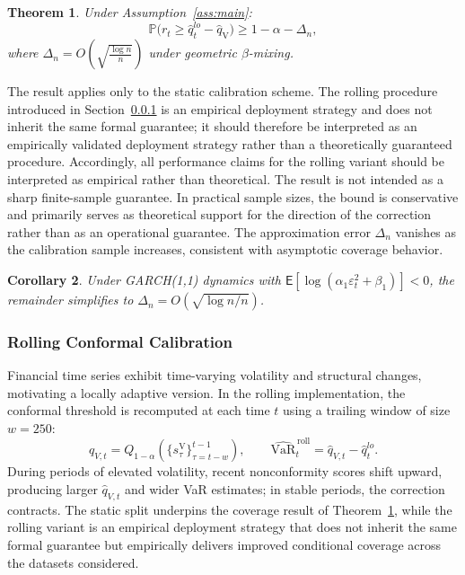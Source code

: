 \documentclass[preprint,11pt,authoryear]{elsarticle}
\newtheorem{theorem}{Theorem}[section]
\newtheorem{corollary}[theorem]{Corollary}
\newcommand{\VaR}{\mathrm{VaR}}
\newcommand{\E}{\mathsf{E}}
\newcommand{\1}{\boldsymbol{1}}
\newcommand{\qV}{\hat{q}_{\scriptscriptstyle\mathrm{V}}}
\begin{document}
	\begin{theorem}
		\label{thm:dependent_conformal_var}
		Under Assumption~\ref{ass:main}:
		\[
		\mathbb{P}\big(r_{t} \geq \hat{q}_t^{lo} - \qV\big)
		\ge 1 - \alpha - \Delta_n,
		\]
		where $\Delta_n = O\!\left(\sqrt{\frac{\log n}{n}}\right)$
		under geometric $\beta$-mixing.
	\end{theorem}
	
	The result applies only to the static calibration scheme. The rolling procedure introduced in Section~\ref{sec:rolling_method} is an empirical deployment strategy and does not inherit the same formal guarantee; it should therefore be interpreted as an empirically validated deployment strategy rather than a theoretically guaranteed procedure. Accordingly, all performance claims for the rolling variant should be interpreted as empirical rather than theoretical.
	The result is not intended as a sharp finite-sample guarantee. In practical sample sizes, the bound is conservative and primarily serves as theoretical support for the direction of the correction rather than as an operational guarantee.
	The approximation error $\Delta_n$ vanishes as the
	calibration sample increases, consistent with asymptotic coverage behavior.
	
	\begin{corollary}
		\label{cor:garch_conformal_var}
		Under GARCH(1,1) dynamics with
		$\E[\log(\alpha_1\varepsilon_t^2 + \beta_1)] < 0$, the
		remainder simplifies to
		$\Delta_n = O(\sqrt{\log n / n})$.
	\end{corollary}
	
	\subsubsection{Rolling Conformal Calibration}
	\label{sec:rolling_method}
	
	Financial time series exhibit time-varying volatility and
	structural changes, motivating a locally adaptive version. In
	the rolling implementation, the conformal threshold is
	recomputed at each time $t$ using a trailing window of size
	$w = 250$:
	\begin{equation}
		\hat{q}_{V,t} = Q_{1-\alpha}\!\left(
		\{s_\tau^{\mathrm{V}}\}_{\tau=t-w}^{t-1}\right),
		\qquad
		\widehat{\VaR}_t^{\,\mathrm{roll}}
		= \hat{q}_{V,t} - \hat{q}_t^{lo}.
		\label{eq:rolling_qv}
	\end{equation}
	During periods of elevated volatility, recent nonconformity
	scores shift upward, producing larger $\hat{q}_{V,t}$ and
	wider VaR estimates; in stable periods, the correction
	contracts. The static split underpins the coverage result of
	Theorem~\ref{thm:dependent_conformal_var}, while the rolling
	variant is an empirical deployment strategy that does not
	inherit the same formal guarantee but empirically delivers
	improved conditional coverage across the datasets considered.
\end{document}
